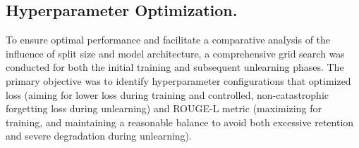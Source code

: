 \begin{table}[h!t]
  \centering
  \small
  \setlength{\tabcolsep}{3pt}
  \caption{ROUGE-L recall performance on Gemma 7B for 10\% forget-set size. Top: rare unlearning splits; Bottom: popular unlearning splits.}
  \label{tab:gemma_unlearn}
\end{table}

\subsection{Hyperparameter Optimization.}
\label{sec:hyperparameters}

To ensure optimal performance and facilitate a comparative analysis of the influence of split size and model architecture, a comprehensive grid search was conducted for both the initial training and subsequent unlearning phases. The primary objective was to identify hyperparameter configurations that optimized loss (aiming for lower loss during training and controlled, non-catastrophic forgetting loss during unlearning) and ROUGE-L metric (maximizing for training, and maintaining a reasonable balance to avoid both excessive retention and severe degradation during unlearning).

